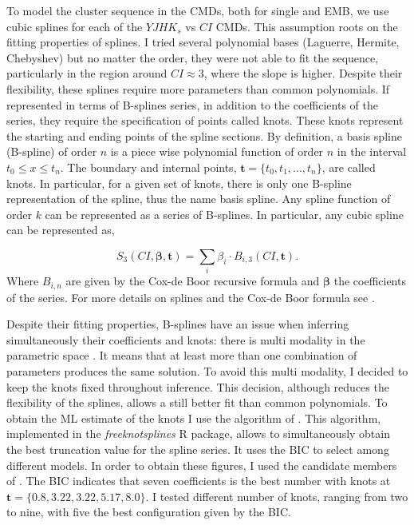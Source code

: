 To model the cluster sequence in the CMDs, both for single and EMB, we use cubic splines for each of the $YJHK_s$ vs $CI$ CMDs. This assumption roots on the fitting properties of splines. I tried several polynomial bases (Laguerre, Hermite, Chebyshev) but no matter the order, they were not able to fit the sequence, particularly in the region around $CI \approx 3$, where the slope is higher. Despite their flexibility, these splines require more parameters than common polynomials. If represented in terms of B-splines series, in addition to the coefficients of the series, they require the specification of points called knots. These knots represent the starting and ending points of the spline sections. By definition, a basis spline (B-spline) of order $n$ is a piece wise polynomial function of order $n$ in the interval $t_0 \leq x \leq t_n$. The boundary and internal points, $\mathbf{t}=\{t_0,t_1,...,t_n\}$, are called knots. In particular, for a given set of knots, there is only one B-spline representation of the spline, thus the name basis spline. Any spline function of order $k$ can be represented as a series of B-splines. In particular, any cubic spline can be represented as,

\begin{equation}
S_3(CI,\boldsymbol{\beta},\mathbf{t}) = \sum_i \beta_i\cdot B_{i,3}(CI,\mathbf{t}).
\end{equation}
Where $B_{i,n}$ are given by the Cox-de Boor recursive formula and $\boldsymbol{\beta}$ the coefficients of the series. For more details on splines and the Cox-de Boor formula see \citet{deBoor1978}.



Despite their fitting properties, B-splines have an issue when inferring simultaneously their coefficients and knots: there is multi modality in the parametric space \citep{Lindstrom1999}. It means that at least more than one combination of parameters produces the same solution. To avoid this multi modality, I decided to keep the knots fixed throughout inference. This decision, although reduces the flexibility of the splines, allows a still better fit than common polynomials. To obtain the ML estimate of the knots I use the algorithm of  \citet{Spiriti2013}. This algorithm, implemented in the \emph{freeknotsplines} R package, allows to simultaneously obtain the best truncation value for the spline series. It uses the BIC to select among different models. In order to obtain these figures, I used the candidate members of \citet{Bouy2015}. The BIC indicates that seven coefficients is the best number with knots at $\mathbf{t}=\{0.8,3.22,3.22,5.17,8.0\}$. I tested different number of knots, ranging from two to nine, with five the best configuration given by the BIC. 

